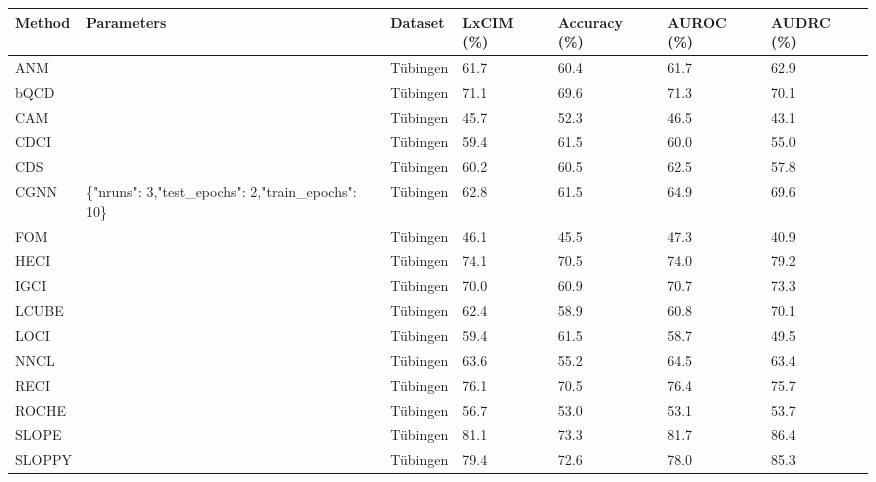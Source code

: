 \begin{tabular}{lllllll}
\toprule
Method & Parameters & Dataset & LxCIM (\%) & Accuracy (\%) & AUROC (\%) & AUDRC (\%) \\
\midrule
ANM &  & Tübingen & 61.7 & 60.4 & 61.7 & 62.9 \\
bQCD &  & Tübingen & 71.1 & 69.6 & 71.3 & 70.1 \\
CAM &  & Tübingen & 45.7 & 52.3 & 46.5 & 43.1 \\
CDCI &  & Tübingen & 59.4 & 61.5 & 60.0 & 55.0 \\
CDS &  & Tübingen & 60.2 & 60.5 & 62.5 & 57.8 \\
CGNN & \{"nruns": 3,"test\_epochs": 2,"train\_epochs": 10\} & Tübingen & 62.8 & 61.5 & 64.9 & 69.6 \\
FOM &  & Tübingen & 46.1 & 45.5 & 47.3 & 40.9 \\
HECI &  & Tübingen & 74.1 & 70.5 & 74.0 & 79.2 \\
IGCI &  & Tübingen & 70.0 & 60.9 & 70.7 & 73.3 \\
LCUBE &  & Tübingen & 62.4 & 58.9 & 60.8 & 70.1 \\
LOCI &  & Tübingen & 59.4 & 61.5 & 58.7 & 49.5 \\
NNCL &  & Tübingen & 63.6 & 55.2 & 64.5 & 63.4 \\
RECI &  & Tübingen & 76.1 & 70.5 & 76.4 & 75.7 \\
ROCHE &  & Tübingen & 56.7 & 53.0 & 53.1 & 53.7 \\
SLOPE &  & Tübingen & 81.1 & 73.3 & 81.7 & 86.4 \\
SLOPPY &  & Tübingen & 79.4 & 72.6 & 78.0 & 85.3 \\
\bottomrule
\end{tabular}
